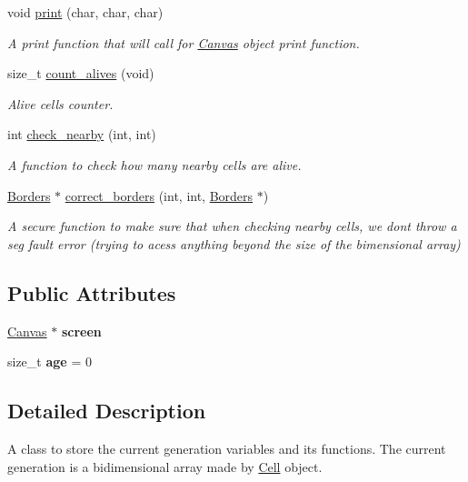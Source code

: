 \begin{DoxyCompactItemize}
void \mbox{\hyperlink{class_gen_a9b0b1490241e3accfff88b127bdf839c}{print}} (char, char, char)
\begin{DoxyCompactList}\small\item\em A print function that will call for \mbox{\hyperlink{class_canvas}{Canvas}} object print function. \end{DoxyCompactList}\item 
size\+\_\+t \mbox{\hyperlink{class_gen_a5594dd316d8de5ce9d621f04b73a988d}{count\+\_\+alives}} (void)
\begin{DoxyCompactList}\small\item\em Alive cells counter. \end{DoxyCompactList}\item 
int \mbox{\hyperlink{class_gen_a0b7ca7ba7fb58a700d745ada96a8e802}{check\+\_\+nearby}} (int, int)
\begin{DoxyCompactList}\small\item\em A function to check how many nearby cells are alive. \end{DoxyCompactList}\item 
\mbox{\hyperlink{class_borders}{Borders}} $\ast$ \mbox{\hyperlink{class_gen_a99f9fd1b5b81d1c65b5acf13c4d0f372}{correct\+\_\+borders}} (int, int, \mbox{\hyperlink{class_borders}{Borders}} $\ast$)
\begin{DoxyCompactList}\small\item\em A secure function to make sure that when checking nearby cells, we dont throw a seg fault error (trying to acess anything beyond the size of the bimensional array) \end{DoxyCompactList}\end{DoxyCompactItemize}
\subsection*{Public Attributes}
\begin{DoxyCompactItemize}
\item 
\mbox{\label{class_gen_a114b41253e5932e5fc346ca0214f94b0}} 
\mbox{\hyperlink{class_canvas}{Canvas}} $\ast$ {\bfseries screen}
\item 
\mbox{\label{class_gen_a4d77727ea35a66c69c2f57ca254556b4}} 
size\+\_\+t {\bfseries age} = 0
\end{DoxyCompactItemize}


\subsection{Detailed Description}
A class to store the current generation variables and it\textquotesingle{}s functions. The current generation is a bidimensional array made by \mbox{\hyperlink{class_cell}{Cell}} object. 


